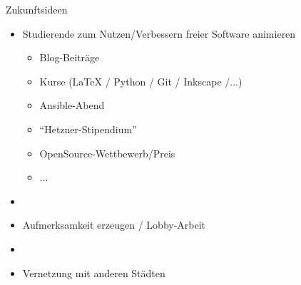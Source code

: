 \documentclass[t]{beamer}
\begin{document}

\begin{frame}[label=ct3]{\color{fg}Zukunftsideen}
\begin{itemize}
 \item Studierende zum Nutzen/Verbessern freier Software animieren
\begin{itemize}
 \item Blog-Beiträge
 \item Kurse (LaTeX / Python / Git / Inkscape /...)
 \item Ansible-Abend
 \item "`Hetzner-Stipendium"'
 \item OpenSource-Wettbewerb/Preis
 \item ...
 \end{itemize}
 
 \item[]
 \item Aufmerksamkeit erzeugen / Lobby-Arbeit
 \item[]
 \item Vernetzung mit anderen Städten

\end{itemize}

 
\end{frame}




\end{document}
